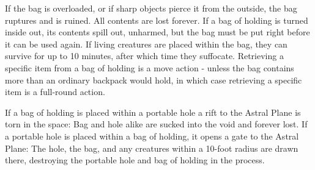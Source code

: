 If the bag is overloaded, or if sharp objects pierce it from the outside, the bag ruptures and is ruined. All contents are lost forever. If a bag of holding is turned inside out, its contents spill out, unharmed, but the bag must be put right before it can be used again. If living creatures are placed within the bag, they can survive for up to 10 minutes, after which time they suffocate. Retrieving a specific item from a bag of holding is a move action - unless the bag contains more than an ordinary backpack would hold, in which case retrieving a specific item is a full-round action.

If a bag of holding is placed within a portable hole a rift to the Astral Plane is torn in the space: Bag and hole alike are sucked into the void and forever lost. If a portable hole is placed within a bag of holding, it opens a gate to the Astral Plane: The hole, the bag, and any creatures within a 10-foot radius are drawn there, destroying the portable hole and bag of holding in the process.


